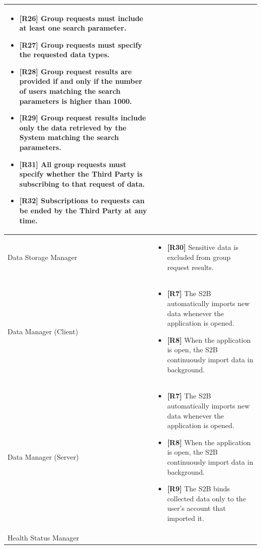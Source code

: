 \documentclass[titlepage]{article}
\begin{document}
\begin{longtable}{| p{5 cm} | p{8 cm} |}
\begin{itemize}
			\item {\bf [R26]} Group requests must include at least one search parameter. 
			\item {\bf [R27]} Group requests must specify the requested data types. 
			\item {\bf [R28]} Group request results are provided if and only if the number of users matching the search parameters is higher than 1000. 
			\item {\bf [R29]} Group request results include only the data retrieved by the System matching the search parameters. 
			\item {\bf [R31]} All group requests must specify whether the Third Party is subscribing to that request of data. 
			\item {\bf [R32]} Subscriptions to requests can be ended by the Third Party at any time.
		\end{itemize}		
		\\	 \hline
		\newline Data Storage Manager & 
		\begin{itemize}
			\item {\bf [R30]} Sensitive data is excluded from group request results. 
		\end{itemize}		
		\\	 \hline	
		\newline Data Manager (Client) & 
		\begin{itemize}
			\item {\bf [R7]} The S2B automatically imports new data whenever the application is opened.
			\item {\bf [R8]} When the application is open, the S2B continuously import data in background.
		\end{itemize}		
		\\	 \hline	
		\newline Data Manager (Server) & 
		\begin{itemize}
			\item {\bf [R7]} The S2B automatically imports new data whenever the application is opened.
			\item {\bf [R8]} When the application is open, the S2B continuously import data in background.
			\item {\bf [R9]} The S2B binds collected data only to the user’s account that imported it. 
		\end{itemize}		
		\\	 \hline	
		\newline Health Status Manager & 
		\begin{itemize}

\end{itemize}
\end{longtable}
\end{document}
